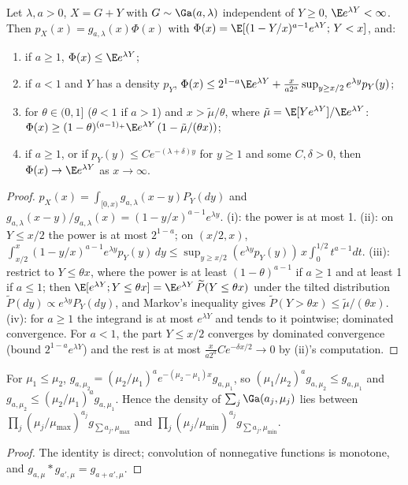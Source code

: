 \begin{lemma}\label{lem:gconv}
Let $\lambda,a>0$, $X=G+Y$ with $G\sim\Ga(a,\lambda)$ independent of $Y\ge0$, $\E e^{\lambda Y}<\infty$. Then
$p_X(x)=g_{a,\lambda}(x)\Phi(x)$ with $\Phi(x)=\E[(1-Y/x)^{a-1}e^{\lambda Y};\,Y<x]$, and:
\begin{enumerate}[label=(\roman*)]
\item if $a\ge1$, $\Phi(x)\le\E e^{\lambda Y}$;
\item if $a<1$ and $Y$ has a density $p_Y$, $\Phi(x)\le2^{1-a}\E e^{\lambda Y}+\frac{x}{a2^a}\sup_{y\ge
x/2}e^{\lambda y}p_Y(y)$;
\item for $\theta\in(0,1]$ ($\theta<1$ if $a>1$) and $x>\tilde\mu/\theta$, where $\tilde\mu=\E[Ye^{\lambda
Y}]/\E e^{\lambda Y}$: $\Phi(x)\ge(1-\theta)^{(a-1)_+}\E e^{\lambda Y}\,(1-\tilde\mu/(\theta x))$;
\item if $a\ge1$, or if $p_Y(y)\le Ce^{-(\lambda+\delta)y}$ for $y\ge1$ and some $C,\delta>0$, then
$\Phi(x)\to\E e^{\lambda Y}$ as $x\to\infty$.
\end{enumerate}
\end{lemma}
\begin{proof}
$p_X(x)=\int_{[0,x)}g_{a,\lambda}(x-y)P_Y(dy)$ and $g_{a,\lambda}(x-y)/g_{a,\lambda}(x)=(1-y/x)^{a-1}e^{\lambda
y}$. (i): the power is at most 1. (ii): on $Y\le x/2$ the power is at most $2^{1-a}$; on $(x/2,x)$,
$\int_{x/2}^x(1-y/x)^{a-1}e^{\lambda y}p_Y(y)\,dy\le\sup_{y\ge x/2}(e^{\lambda y}p_Y(y))\,x\int_0^{1/2}t^{a-1}dt$.
(iii): restrict to $Y\le\theta x$, where the power is at least $(1-\theta)^{a-1}$ if $a\ge1$ and at least 1 if
$a\le1$; then $\E[e^{\lambda Y};Y\le\theta x]=\E e^{\lambda Y}\,\widetilde P(Y\le\theta x)$ under the tilted
distribution $\widetilde P(dy)\propto e^{\lambda y}P_Y(dy)$, and Markov's inequality gives $\widetilde P(Y>\theta
x)\le\tilde\mu/(\theta x)$. (iv): for $a\ge1$ the integrand is at most $e^{\lambda Y}$ and tends to it pointwise;
dominated convergence. For $a<1$, the part $Y\le x/2$ converges by dominated convergence (bound
$2^{1-a}e^{\lambda Y}$) and the rest is at most $\frac{x}{a2^a}Ce^{-\delta x/2}\to0$ by (ii)'s computation.
\end{proof}

\begin{lemma}[Merging]\label{lem:merge}
For $\mu_1\le\mu_2$, $g_{a,\mu_2}=(\mu_2/\mu_1)^ae^{-(\mu_2-\mu_1)x}g_{a,\mu_1}$, so
$(\mu_1/\mu_2)^ag_{a,\mu_2}\le g_{a,\mu_1}$ and $g_{a,\mu_2}\le(\mu_2/\mu_1)^ag_{a,\mu_1}$. Hence the density of
$\sum_j\Ga(a_j,\mu_j)$ lies between $\prod_j(\mu_j/\mu_{\max})^{a_j}g_{\sum a_j,\mu_{\max}}$ and
$\prod_j(\mu_j/\mu_{\min})^{a_j}g_{\sum a_j,\mu_{\min}}$.
\end{lemma}
\begin{proof}
The identity is direct; convolution of nonnegative functions is monotone, and $g_{a,\mu}*g_{a',\mu}=g_{a+a',\mu}$.
\end{proof}

